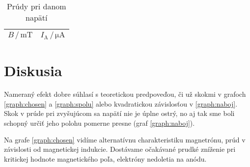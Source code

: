 \documentclass[a4paper, 10pt]{article}
\newcommand{\unit}[1]{\ensuremath{\, \mathrm{#1}}}
\newcommand{\di}[1]{\ensuremath{_\mathrm{#1}}}
\begin{document}
\begin{table}[t]
\centering
\hspace*{60pt}
\begin{tabular}{c|c}
$ B\,/\unit{mT} $& 
$ I\di A\,/\unit{\mu A}$ 
\\
\midrule 

\end{tabular}
\newline
\vspace*{2pt}
\caption{Prúdy pri danom napätí \label{tab:chosen}}
\end{table}


\begin{graph}[t]
\centering
\vspace*{-15pt}
\hspace*{-50pt}

\caption{ Kritické napätie pri danom poli, určenie merného náboja \label{graph:spolu}}
\end{graph}


\section*{Diskusia}
Nameraný efekt dobre súhlasí s teoretickou predpoveďou, či už skokmi v grafoch \ref{graph:chosen} a \ref{graph:spolu} alebo kvadratickou závislosťou v \ref{graph:naboj}. Skok v prúde pri zvyšujúcom sa napätí nie je úplne ostrý, no aj tak sme boli schopný určiť jeho polohu pomerne presne (graf \ref{graph:naboj}). 

Na grafe \ref{graph:chosen} vidíme alternatívnu charakteristiku magnetrónu, prúd v závislosti od magnetickej indukcie. Dostávame očakávané prudké zníženie pri kritickej hodnote magnetického poľa, elektróny nedoletia na anódu.
\end{document}
